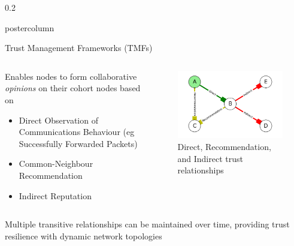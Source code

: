 \documentclass[final,hyperref={pdfpagelabels=false}]{beamer}
\def\colwidth{0.2\linewidth}
\begin{document}
\begin{frame}[fragile]
\begin{columns}[T]
\begin{column}{\colwidth}
\begin{beamercolorbox}[center,wd=\textwidth]{postercolumn}
\begin{minipage}[T]{.98\textwidth}
{\begin{block}{Trust Management Frameworks (TMFs)}
							\begin{columns}[T]
								\begin{column}{0.45\textwidth}
									Enables nodes to form collaborative \emph{opinions} on their cohort nodes based on
									\begin{itemize}
										\item Direct Observation of Communications Behaviour (eg Successfully Forwarded Packets)
										\item Common-Neighbour Recommendation
										\item Indirect Reputation
									\end{itemize}
								\end{column}
								\begin{column}{0.45\textwidth}
									\begin{figure}[H]
										\centering
										\includegraphics[width=\linewidth]{node_relationships}
										\vspace{1ex}
										\caption{Direct, Recommendation, and Indirect trust relationships}
									\end{figure}
								\end{column}
							\end{columns}
							
							\vspace{0.3\baselineskip}
							
							Multiple transitive relationships can be maintained over time, providing trust resilience with dynamic network topologies 
							

\end{block}}
\end{minipage}
\end{beamercolorbox}
\end{column}
\end{columns}
\end{frame}
\end{document}
